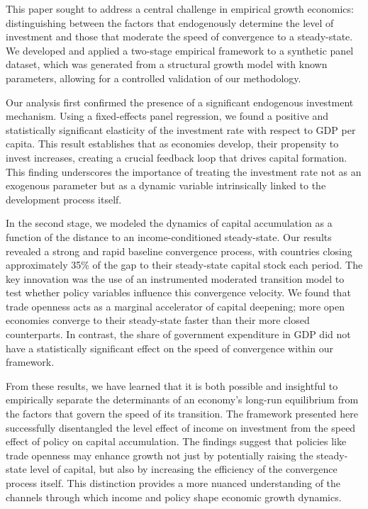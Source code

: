 \documentclass[]{article}
\begin{document}
This paper sought to address a central challenge in empirical growth economics: distinguishing between the factors that endogenously determine the level of investment and those that moderate the speed of convergence to a steady-state. We developed and applied a two-stage empirical framework to a synthetic panel dataset, which was generated from a structural growth model with known parameters, allowing for a controlled validation of our methodology.

Our analysis first confirmed the presence of a significant endogenous investment mechanism. Using a fixed-effects panel regression, we found a positive and statistically significant elasticity of the investment rate with respect to GDP per capita. This result establishes that as economies develop, their propensity to invest increases, creating a crucial feedback loop that drives capital formation. This finding underscores the importance of treating the investment rate not as an exogenous parameter but as a dynamic variable intrinsically linked to the development process itself.

In the second stage, we modeled the dynamics of capital accumulation as a function of the distance to an income-conditioned steady-state. Our results revealed a strong and rapid baseline convergence process, with countries closing approximately 35\% of the gap to their steady-state capital stock each period. The key innovation was the use of an instrumented moderated transition model to test whether policy variables influence this convergence velocity. We found that trade openness acts as a marginal accelerator of capital deepening; more open economies converge to their steady-state faster than their more closed counterparts. In contrast, the share of government expenditure in GDP did not have a statistically significant effect on the speed of convergence within our framework.

From these results, we have learned that it is both possible and insightful to empirically separate the determinants of an economy's long-run equilibrium from the factors that govern the speed of its transition. The framework presented here successfully disentangled the level effect of income on investment from the speed effect of policy on capital accumulation. The findings suggest that policies like trade openness may enhance growth not just by potentially raising the steady-state level of capital, but also by increasing the efficiency of the convergence process itself. This distinction provides a more nuanced understanding of the channels through which income and policy shape economic growth dynamics.
\end{document}
